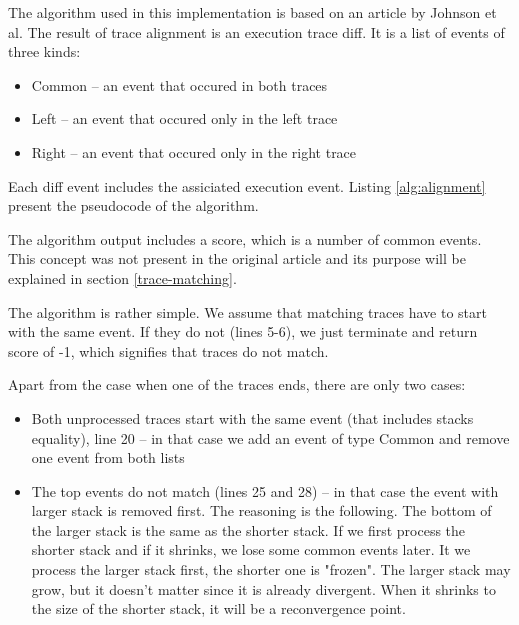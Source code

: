 The algorithm used in this implementation is based on an article by Johnson et al. \cite{ieee:alignment-and-slicing}
The result of trace alignment is an execution trace diff. It is a list of events of three kinds:
\begin{itemize}
  \item Common -- an event that occured in both traces
  \item Left -- an event that occured only in the left trace
  \item Right -- an event that occured only in the right trace
\end{itemize}

Each diff event includes the assiciated execution event.
Listing \ref{alg:alignment} present the pseudocode of the algorithm.


                       
The algorithm output includes a score, which is a number of common events.
This concept was not present in the original article and its purpose 
will be explained in section \ref{trace-matching}.

The algorithm is rather simple. We assume that matching traces have to start with the same
event. If they do not (lines 5-6), we just terminate and return score of -1, 
which signifies that traces do not match.

Apart from the case when one of the traces ends, there are only two cases:
\begin{itemize}
  \item Both unprocessed traces start with the same event (that includes stacks equality), line 20 -- in that case
  			we add an event of type Common and remove one event from both lists
  \item The top events do not match (lines 25 and 28) -- in that case the event with larger stack is removed first.
           The reasoning is the following. The bottom of the larger stack is the same as the shorter stack.
           If we first process the shorter stack and if it shrinks, we lose some common events later.
           It we process the larger stack first, the shorter one is "frozen". The larger stack may grow, but it doesn't matter
           since it is already divergent. When it shrinks to the size of the shorter stack, it will be a reconvergence point.
\end{itemize}


